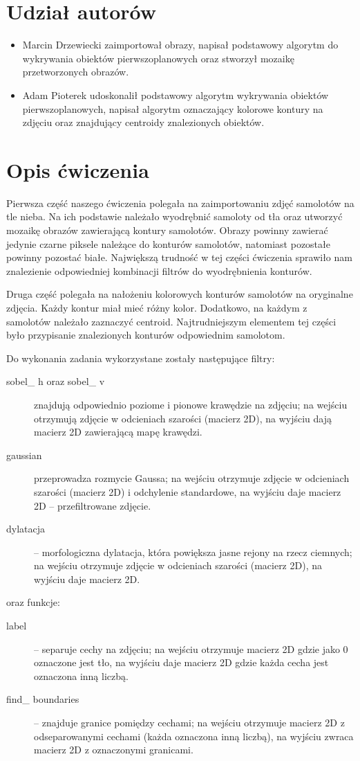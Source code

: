 \documentclass{article}
\begin{document}


\section*{Udział autorów}
\begin{itemize}
\item Marcin Drzewiecki zaimportował obrazy, napisał podstawowy algorytm do wykrywania obiektów pierwszoplanowych oraz stworzył mozaikę przetworzonych obrazów.
\item Adam Pioterek udoskonalił podstawowy algorytm wykrywania obiektów pierwszoplanowych, napisał algorytm oznaczający kolorowe kontury na zdjęciu oraz znajdujący centroidy znalezionych obiektów.
\end{itemize}

\section{Opis ćwiczenia}
Pierwsza część naszego ćwiczenia polegała na zaimportowaniu zdjęć samolotów na tle nieba.
Na ich podstawie należało wyodrębnić samoloty od tła oraz utworzyć mozaikę obrazów zawierającą kontury samolotów. 
Obrazy powinny zawierać jedynie czarne piksele należące do konturów samolotów, natomiast pozostałe powinny pozostać białe.
Największą trudność w tej części ćwiczenia sprawiło nam znalezienie odpowiedniej kombinacji filtrów do wyodrębnienia konturów.

Druga część polegała na nałożeniu kolorowych konturów samolotów na oryginalne zdjęcia.
Każdy kontur miał mieć różny kolor.
Dodatkowo, na każdym z samolotów należało zaznaczyć centroid.
Najtrudniejszym elementem tej części było przypisanie znalezionych konturów odpowiednim samolotom.

Do wykonania zadania wykorzystane zostały następujące filtry:
\begin{description}
\item[sobel\_ h oraz sobel\_ v] znajdują odpowiednio poziome i pionowe krawędzie na zdjęciu;
na wejściu otrzymują zdjęcie w odcieniach szarości (macierz 2D), na wyjściu dają macierz 2D zawierającą mapę krawędzi.
\item[gaussian] przeprowadza rozmycie Gaussa;
na wejściu otrzymuje zdjęcie w odcieniach szarości (macierz 2D) i odchylenie standardowe, na wyjściu daje macierz 2D – przefiltrowane zdjęcie.
\item[dylatacja] – morfologiczna dylatacja, która powiększa jasne rejony na rzecz ciemnych;
na wejściu otrzymuje zdjęcie w odcieniach szarości (macierz 2D), na wyjściu daje macierz 2D.
\end{description}
oraz funkcje:
\begin{description}
\item[label] – separuje cechy na zdjęciu;
na wejściu otrzymuje macierz 2D gdzie jako 0 oznaczone jest tło, na wyjściu daje macierz 2D gdzie każda cecha jest oznaczona inną liczbą.
\item[find\_ boundaries] – znajduje granice pomiędzy cechami;
na wejściu otrzymuje macierz 2D z odseparowanymi cechami (każda oznaczona inną liczbą), na wyjściu zwraca macierz 2D z oznaczonymi granicami.
\end{description}
 
\end{document}
